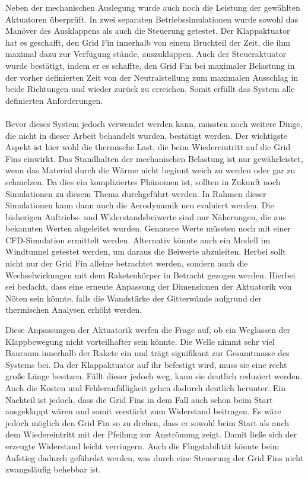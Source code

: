Neben der mechanischen Auslegung wurde auch noch die Leistung der gewählten Aktuatoren überprüft. In zwei separaten Betriebssimulationen wurde sowohl das Manöver des Ausklappens als auch die Steuerung getestet. Der Klappaktuator hat es geschafft, den Grid Fin innerhalb von einem Bruchteil der Zeit, die ihm maximal dazu zur Verfügung stände, auszuklappen. Auch der Steueraktuator wurde bestätigt, indem er es schaffte, den Grid Fin bei maximaler Belastung in der vorher definierten Zeit von der Neutralstellung zum maximalen Ausschlag in beide Richtungen und wieder zurück  zu erreichen. Somit erfüllt das System alle definierten Anforderungen.
\\~\\
Bevor dieses System jedoch verwendet werden kann, müssten noch weitere Dinge, die nicht in dieser Arbeit behandelt wurden, bestätigt werden. Der wichtigste Aspekt ist hier wohl die thermische Last, die beim Wiedereintritt auf die Grid Fins einwirkt. Das Standhalten der mechanischen Belastung ist nur gewährleistet, wenn das Material durch die Wärme nicht beginnt weich zu werden oder gar zu schmelzen. Da dies ein kompliziertes Phänomen ist, sollten in Zukunft noch Simulationen zu diesem Thema durchgeführt werden. In Rahmen dieser Simulationen kann dann auch die Aerodynamik neu evaluiert werden. Die bisherigen Auftriebs- und Widerstandsbeiwerte sind nur Näherungen, die aus bekannten Werten abgeleitet wurden. Genauere Werte müssten noch mit einer CFD-Simulation ermittelt werden. Alternativ könnte auch ein Modell im Windtunnel getestet werden, um daraus die Beiwerte abzuleiten. Herbei sollt nicht nur der Grid Fin alleine betrachtet werden, sondern auch die Wechselwirkungen mit dem Raketenkörper in Betracht gezogen werden. Hierbei sei bedacht, dass eine erneute Anpassung der Dimensionen der  Aktuatorik von Nöten sein könnte, falls die Wandstärke der Gitterwände aufgrund der thermischen Analysen erhöht werden.

Diese Anpassungen der Aktuatorik werfen die Frage auf, ob ein Weglassen der Klappbewegung nicht vorteilhafter sein könnte. Die Welle nimmt sehr viel Bauraum innerhalb der Rakete ein und trägt signifikant zur Gesamtmasse des Systems bei. Da der Klappaktuator auf ihr befestigt wird, muss sie eine recht große Länge besitzen. Fällt dieser jedoch weg, kann sie deutlich reduziert werden. Auch die Kosten und Fehleranfälligkeit gehen dadurch deutlich herunter. Ein Nachteil ist jedoch, dass die Grid Fins in dem Fall auch schon beim Start ausgeklappt wären und somit verstärkt zum Widerstand beitragen. Es wäre jedoch möglich den Grid Fin so zu drehen, dass er sowohl beim Start als auch dem Wiedereintritt mit der Pfeilung zur Anströmung zeigt. Damit ließe sich der erzeugte Widerstand leicht verringern. Auch die Flugstabilität könnte beim Aufstieg dadurch gefährdet werden, was durch eine Steuerung der Grid Fins nicht zwangsläufig behebbar ist.

